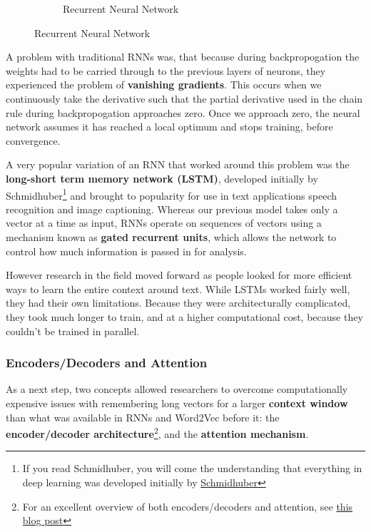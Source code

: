 \documentclass[11pt, table]{diazessay} %
\begin{document}
\begin{sloppypar}
\begin{figure}[H]
\begin{subfigure}[b]{0.4\linewidth}
\begin{tikzpicture}
\end{tikzpicture}
\caption{Recurrent Neural Network}
\end{subfigure}
\end{figure}

A problem with traditional RNNs was, that because during backpropogation the weights had to be carried through to the previous layers of neurons, they experienced the problem of \textbf{vanishing gradients}. This occurs when we continuously take the derivative such that the partial derivative used in the chain rule during backpropogation approaches zero. Once we approach zero, the neural network assumes it has reached a local optimum and stops training, before convergence. 

A very popular variation of an RNN that worked around this problem was the \textbf{long-short term memory network (LSTM)}, developed initially by Schmidhuber\footnote{If you read Schmidhuber, you will come the understanding that everything in deep learning was developed initially by \href{https://people.idsia.ch/~juergen/deep-learning-miraculous-year-1990-1991.html}{Schmidhuber}} and brought to popularity for use in text applications speech recognition and image captioning\citep{karpathy_2015}.  Whereas our previous model takes only a vector at a time as input, RNNs operate on sequences of vectors using a mechanism known as \textbf{gated recurrent units}, which allows the network to control how much information is passed in for analysis. 

However research in the field moved forward as people looked for more efficient ways to learn the entire context around text. While LSTMs worked fairly well, they had their own limitations. Because they were architecturally complicated, they took much longer to train, and at a higher computational cost, because they couldn't be trained in parallel. 


\subsubsection{Encoders/Decoders and Attention}
As a next step, two concepts allowed researchers to overcome computationally expensive issues with remembering long vectors for a larger \textbf{context window} than what was available in RNNs and Word2Vec before it: the \textbf{encoder/decoder architecture}\footnote{For an excellent overview of both encoders/decoders and attention, see  \href{https://lilianweng.github.io/posts/2018-06-24-attention/}{this blog post}}, and the \textbf{attention mechanism}. 


\end{sloppypar}
\end{document}
